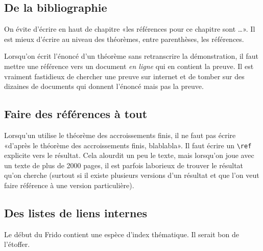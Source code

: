 \subsection{De la bibliographie}

On évite d'écrire en haut de chapitre «les références pour ce chapitre sont \ldots». Il est mieux d'écrire au niveau des théorèmes, entre parenthèses, les références.

Lorsqu'on écrit l'énoncé d'un théorème sans retranscrire la démonstration, il faut mettre une référence vers un document \emph{en ligne} qui en contient la preuve. Il est vraiment fastidieux de chercher une preuve sur internet et de tomber sur des dizaines de documents qui donnent l'énoncé mais pas la preuve.

\subsection{Faire des références à tout}

Lorsqu'un utilise le théorème des accroissements finis, il ne faut pas écrire «d'après le théorème des accroissements finis, blablabla». Il faut écrire un \verb+\ref+ explicite vers le résultat. Cela alourdit un peu le texte, mais lorsqu'on joue avec un texte de plus de 2000 pages, il est parfois laborieux de trouver le résultat qu'on cherche (surtout si il existe plusieurs versions d'un résultat et que l'on veut faire référence à une version particulière).

\subsection{Des listes de liens internes}

Le début du Frido contient une espèce d'index thématique. Il serait bon de l'étoffer.

